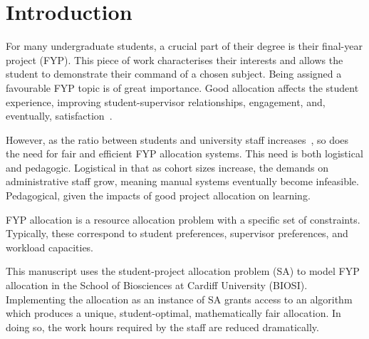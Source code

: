 \section{Introduction}\label{sec:intro}


For many undergraduate students, a crucial part of their degree is their
final-year project (FYP). This piece of work characterises their interests and
allows the student to demonstrate their command of a chosen subject. Being
assigned a favourable FYP topic is of great importance. Good allocation affects
the student experience, improving student-supervisor relationships, engagement,
and, eventually, satisfaction~\cite{Briffa2018,Kuh2009}.

However, as the ratio between students and university staff
increases~\cite{McDonald2013}, so does the need for fair and efficient FYP
allocation systems. This need is both logistical and pedagogic. Logistical in
that as cohort sizes increase, the demands on administrative staff grow, meaning
manual systems eventually become infeasible. Pedagogical, given the impacts of
good project allocation on learning.

FYP allocation is a resource allocation problem with a specific set of
constraints. Typically, these correspond to student preferences, supervisor
preferences, and workload capacities.

This manuscript uses the student-project allocation problem (SA) to model FYP
allocation in the School of Biosciences at Cardiff University (BIOSI).
Implementing the allocation as an instance of SA grants access to an algorithm
which produces a unique, student-optimal, mathematically fair allocation. In
doing so, the work hours required by the staff are reduced dramatically.
